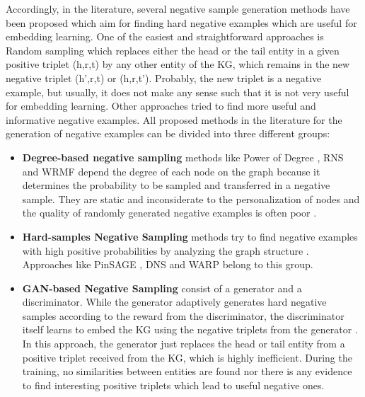 Accordingly, in the literature, several negative sample generation methods have been proposed which aim for finding hard negative examples which are useful for embedding learning.
One of the easiest and straightforward approaches is Random sampling which replaces either the head or the tail entity in a given positive triplet (h,r,t) by any other entity of the KG, which remains in the new negative triplet (h’,r,t) or (h,r,t’). Probably, the new triplet is a negative example, but usually, it does not make any sense such that it is not very useful for embedding learning.
Other approaches tried to find more useful and informative negative examples.
All proposed methods in the literature for the generation of negative examples can be divided into three different groups:

\begin{itemize}
    \item 
    \textbf{Degree-based negative sampling} methods like Power of Degree \cite{MikolovSCCD13}, \ac{RNS}\cite{Dupre2018Word2vec} and \ac{WRMF} \cite{Hu2008Collaborative} depend the degree of each node on the graph because it determines the probability to be sampled and transferred in a negative sample.
    They are static and inconsiderate to the personalization of nodes \cite{MCNS} and the quality of randomly generated negative examples is often poor \cite{cai2017kbgan}.
    
    \item 
    \textbf{Hard-samples Negative Sampling} methods try to find negative examples with high positive probabilities by analyzing the graph structure \cite{MCNS}. 
    Approaches like PinSAGE \cite{PinSAGE}, \ac{DNS} \cite{DNS} and \ac{WARP} \cite{WARP} belong to this group.
    
    \item 
    \textbf{\ac{GAN}-based Negative Sampling} consist of a generator and a discriminator. 
    While the generator adaptively generates hard negative samples according to the reward from the discriminator, the discriminator itself learns to embed the \ac{KG} using the negative triplets from the generator \cite{wang2018incorporating}.
    In this approach, the generator just replaces the head or tail entity from a positive triplet received from the \ac{KG}, which is highly inefficient.
    During the training, no similarities between entities are found nor there is any evidence to find interesting positive triplets which lead to useful negative ones.
\end{itemize}

